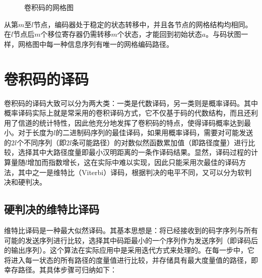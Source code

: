 \begin{figure}[htbp]
	\caption{卷积码的网格图}
	\label{figure:theory:pic5}
\end{figure}


从第$m$至$l$节点，编码器处于稳定的状态转移中，并且各节点的网格结构均相同。在$l$节点后$m$个移位寄存器仍需转移$m$个状态，才能回到初始状态$a$。与码状图一样，网格图中每一种信息序列有唯一的网格编码路径。

\section{卷积码的译码}
卷积码的译码大致可以分为两大类：一类是代数译码，另一类则是概率译码。其中概率译码实际上就是常采用的卷积译码方式，它不仅基于码的代数结构，而且还利用了信道的统计特性，因此他充分地发挥了卷积码的特点，使得译码概率达到最小。对于长度为$l$的二进制码序列的最佳译码，如果用概率译码，需要对可能发送的$2l$个不同序列（即$2l$条可能路径）的对数似然函数累加值（即路径度量）进行比较，选择其中大路径度量即最小汉明距离的一条作译码结果。显然，译码过程的计算量随$l$增加而指数增长，这在实际中难以实现，因此只能采用次最佳的译码方法，其中之一是维特比（Viterbi）译码，根据判决的电平不同，又可以分为软判决和硬判决。
\subsection{硬判决的维特比译码}
维特比译码是一种最大似然译码。其基本思想是：将已经接收到的码字序列与所有可能的发送序列进行比较，选择其中码距最小的一个序列作为发送序列（即译码后的输出序列）。这个算法在实际应用中是采用迭代方式来处理的。在每一步中，它将进入每一状态的所有路径的度量值进行比较，并存储具有最大度量值的路径，即幸存路径。其具体步骤可归纳如下：

